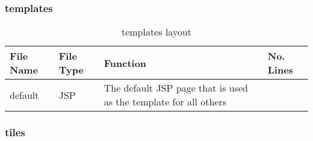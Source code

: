 \subsubsection{templates}
\begin{table}[H]
\begin{center}
     \begin{tabular}{| l | l | l| p{1cm} |}
    \hline
    File Name & File Type & Function & No. Lines\\ \hline
	default & JSP & The default JSP page that is used as the template for all others\\ \hline	
    \end{tabular}
\end{center}
\caption{templates layout}
\end{table}

\subsubsection{tiles}
